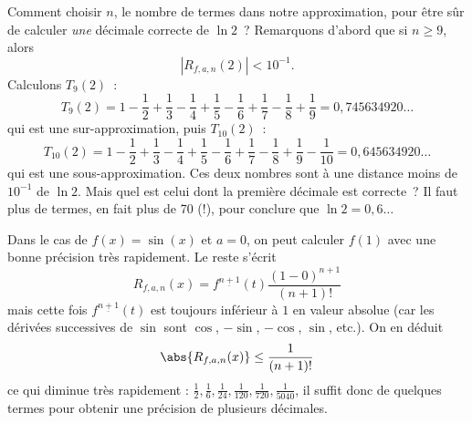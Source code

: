 \begin{frame}{Comment choisir $n$, le nombre de termes dans notre approximation, pour être sûr de calculer \emph{une} décimale correcte de $\ln 2$~?}
  \pause{}
Remarquons d'abord que si \(n \geqslant 9\), alors
\begin{equation*}
  |R_{f,a,n}(2)| < 10^{-1}.
\end{equation*}\pause{}
Calculons $T_9(2)$~:\pause{}
\begin{equation*}
T_9(2) = 1 - \frac{1}{2} + \frac{1}{3} - \frac{1}{4} 
+ \frac{1}{5} - \frac{1}{6} + \frac{1}{7} - \frac{1}{8} + \frac{1}{9} = 0,745634920\ldots
\end{equation*}\pause{}
qui est une sur-approximation\pause{}, puis $T_{10}(2)$~:\pause{}
\begin{equation*}
T_{10}(2) = 1 - \frac{1}{2} + \frac{1}{3} - \frac{1}{4} 
+ \frac{1}{5} - \frac{1}{6} + \frac{1}{7} - \frac{1}{8} + \frac{1}{9}
- \frac{1}{10} = 0,645634920\ldots
\end{equation*}
qui est une sous-approximation.\pause{} Ces deux nombres sont à une distance moins de $10^{-1}$ de $\ln 2$.\pause{} Mais quel est celui dont la première décimale est correcte~?\pause{} Il faut plus de termes\pause{}, en fait plus de 70 ({!})\pause{}, pour conclure que $\ln 2 = 0,6\ldots$

\end{frame}

\begin{frame}
  \begin{example}
    Dans le cas de \(f(x) = \sin(x)\) et \(a = 0\)\pause{}, on peut calculer \(f(1)\) avec une bonne précision très rapidement.\pause{} Le reste s'écrit
    \begin{equation*}
      R_{f,a,n}(x) = f^{\underline{n+1}}(t) \frac{(1-0)^{n+1}}{(n+1)!}
    \end{equation*}\pause{}
    mais cette fois \(f^{\underline{n+1}}(t)\) est toujours inférieur à \(1\) en valeur absolue (car les dérivées successives de \(\sin\) sont \(\cos\), \(-\sin\), \(-\cos\), \(\sin\), etc.).\pause{} On en déduit
    \begin{equation*}
      \abs{R_{f,a,n}(x)} \leq \frac{1}{(n+1)!}
    \end{equation*}\pause{}
    ce qui diminue très rapidement : \(\frac{1}{2}, \frac{1}{6}, \frac{1}{24}, \frac{1}{120}, \frac{1}{720}, \frac{1}{5040}\),\pause{} il suffit donc de quelques termes pour obtenir une précision de plusieurs décimales.
  \end{example}
\end{frame}


